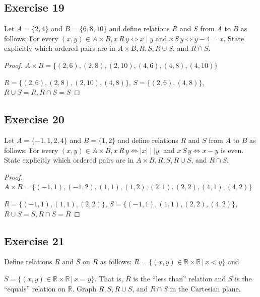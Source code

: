 \documentclass[14pt]{extarticle}
\newcommand{\R}{\mathbb{R}}
\begin{document}
\subsection{Exercise 19}
Let \(A = \{2, 4\}\) and \(B = \{6, 8, 10\}\) and define relations $R$ and $S$ from $A$ to $B$ as follows: For every
\((x, y) \in A \times B, x \, R \, y \iff x \mid y\) and \( x \, S \, y \iff y - 4 = x\). State explicitly which
ordered pairs are in \(A \times B, R, S, R \cup S\), and \(R \cap S\).

\begin{proof}
        \(A \times B = \{(2, 6), (2, 8), (2, 10), (4, 6), (4, 8), (4, 10)\}\)

        \(R = \{(2, 6), (2, 8), (2, 10), (4, 8)\}\), \(S = \{(2, 6), (4, 8)\}\), \(R \cup S = R, R \cap S = S\)
\end{proof}

\subsection{Exercise 20}
Let \(A = \{-1, 1, 2, 4\}\) and \(B = \{1, 2\}\) and define relations $R$ and $S$ from $A$ to $B$ as follows: For every
\((x, y) \in A \times B, x \, R \, y \iff |x| \mid |y|\) and \(x \, S \, y \iff x - y\) is even. State explicitly
which ordered pairs are in \(A \times B, R, S, R \cup S\), and \(R \cap S\).

\begin{proof}
        \(A \times B = \{(-1, 1), (-1, 2), (1, 1), (1, 2), (2, 1), (2, 2), (4, 1), (4, 2)\}\)

        \(R = \{(-1, 1), (1, 1), (2, 2)\}\), \(S = \{(-1, 1), (1, 1), (2, 2), (4, 2)\}\), \(R \cup S = S, R \cap S = R\)
\end{proof}

\subsection{Exercise 21}
Define relations $R$ and $S$ on $R$ as follows: \(R = \{(x, y) \in \R \times \R \, | \, x < y\}\) and

\(S = \{(x, y) \in \R \times \R \, | \, x = y\}\). That is, $R$ is the “less than” relation and $S$ is the “equals”
relation on $\R$. Graph \(R, S, R \cup S\), and \(R \cap S\) in the Cartesian plane.
\end{document}
